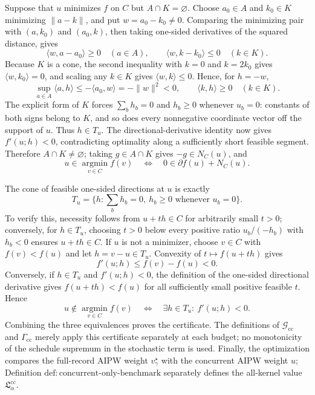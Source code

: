 Suppose that \(u\) minimizes \(f\) on \(C\) but \(A\cap K=\varnothing\).  Choose \(a_0\in A\) and \(k_0\in K\) minimizing \(\|a-k\|\), and put \(w=a_0-k_0\ne0\).  Comparing the minimizing pair with \((a,k_0)\) and \((a_0,k)\), then taking one-sided derivatives of the squared distance, gives
\[
\langle w,a-a_0\rangle\ge0\quad(a\in A),
\qquad
\langle w,k-k_0\rangle\le0\quad(k\in K).
\]
Because \(K\) is a cone, the second inequality with \(k=0\) and \(k=2k_0\) gives \(\langle w,k_0\rangle=0\), and scaling any \(k\in K\) gives \(\langle w,k\rangle\le0\).  Hence, for \(h=-w\),
\[
\sup_{a\in A}\langle a,h\rangle
\le-\langle a_0,w\rangle
=-\|w\|^2<0,
\qquad
\langle k,h\rangle\ge0\quad(k\in K).
\]
The explicit form of \(K\) forces \(\sum_bh_b=0\) and \(h_b\ge0\) whenever \(u_b=0\): constants of both signs belong to \(K\), and so does every nonnegative coordinate vector off the support of \(u\).  Thus \(h\in T_u\).  The directional-derivative identity now gives \(f'(u;h)<0\), contradicting optimality along a sufficiently short feasible segment.  Therefore \(A\cap K\ne\varnothing\); taking \(g\in A\cap K\) gives \(-g\in N_C(u)\), and
\[
u\in\operatorname*{argmin}_{v\in C}f(v)
\quad\Longleftrightarrow\quad
0\in\partial f(u)+N_C(u).
\]

The cone of feasible one-sided directions at \(u\) is exactly
\[
T_u=\{h:\sum_bh_b=0,\ h_b\ge0\text{ whenever }u_b=0\}.
\]
To verify this, necessity follows from \(u+th\in C\) for arbitrarily small \(t>0\); conversely, for \(h\in T_u\), choosing
\(t>0\) below every positive ratio \(u_b/(-h_b)\) with \(h_b<0\) ensures \(u+th\in C\).  If \(u\) is not a minimizer, choose \(v\in C\) with \(f(v)<f(u)\) and let \(h=v-u\in T_u\).  Convexity of \(t\mapsto f(u+th)\) gives
\[
f'(u;h)\le f(v)-f(u)<0.
\]
Conversely, if \(h\in T_u\) and \(f'(u;h)<0\), the definition of the one-sided directional derivative gives \(f(u+th)<f(u)\) for all sufficiently small positive feasible \(t\).  Hence
\[
u\notin\operatorname*{argmin}_{v\in C}f(v)
\quad\Longleftrightarrow\quad
\exists h\in T_u:\ f'(u;h)<0.
\]
Combining the three equivalences proves the certificate.  The definitions of \(\mathcal G_{\mathrm{cc}}\) and \(\Gamma_{\mathrm{cc}}\) merely apply this certificate separately at each budget; no monotonicity of the schedule supremum in the stochastic term is used.  Finally, the optimization compares the full-record AIPW weight \(v_\gamma^\star\) with the concurrent AIPW weight \(u\); Definition \(\mathrm{def:concurrent\text{-}only\text{-}benchmark}\) separately defines the all-kernel value \(\mathfrak L_\alpha^{\mathrm{cc}}\).

